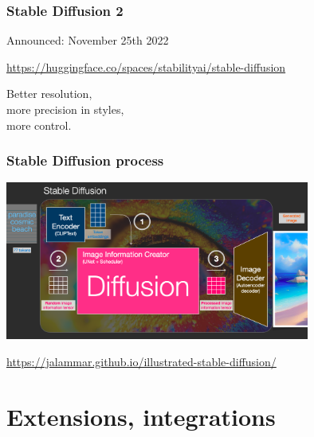 \documentclass[17pt,aspectratio=169,hyperref={pdfusetitle,colorlinks,allcolors=olive}]{beamer}
\begin{document}
\begin{frame}[fragile]
  \frametitle{Stable Diffusion 2}

  Announced: November 25th 2022
  
  \begin{flushright}
    {\scriptsize
      \url{https://huggingface.co/spaces/stabilityai/stable-diffusion} \\
    }
  \end{flushright}

  Better resolution, \\ more precision in styles, \\ more control.
\end{frame}

\begin{frame}[fragile]
  \frametitle{Stable Diffusion process}

      \includegraphics[width=10cm]{figs/sd-process}

  \begin{flushright}
    {\scriptsize
    \url{https://jalammar.github.io/illustrated-stable-diffusion/}
    }
  \end{flushright}

\end{frame}


\section{Extensions, integrations}
\end{document}
